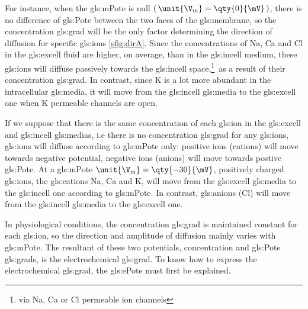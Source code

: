 \documentclass[class={myRUCProject}, crop=false]{standalone}
\begin{document}
For instance, when the \gls{gls:mPote} is null \(\br{\unit{\V\membrane}=\qty{0}{\mV}}\), there is no difference of \gls{gls:Pote} between the two faces of the \gls{gls:membrane}, so the concentration \gls{gls:grad} will be the only factor determining the direction of diffusion for specific \glspl{gls:ion} \cref{sfig:dirA}. 
Since the concentrations of \gls{Na}, \gls{Ca} and \gls{Cl} in the \gls{gls:excell} fluid are higher, on average, than in the \gls{gls:incell} medium, these \glspl{gls:ion} will diffuse passively towards the \gls{gls:incell} space,\footnote{via \gls{Na}, \gls{Ca} or \gls{Cl} permeable ion channels}~as a result of their concentration \gls{gls:grad}. 
In contrast, since \gls{K} is a lot more abundant in the intracellular \gls{gls:media}, it will move from the \gls{gls:incell} \gls{gls:media} to the \gls{gls:excell} one when \gls{K} permeable channels are open. 

If we suppose that there is the same concentration of each \gls{gls:ion} in the \gls{gls:excell} and \gls{gls:incell} \glspl{gls:media}, i.e there is no concentration \gls{gls:grad} for any \glspl{gls:ion}, \glspl{gls:ion} will diffuse according to \gls{gls:mPote} only: positive ions (cations) will move towards negative potential, negative ions (anions) will move towards postive \gls{gls:Pote}. At a \gls{gls:mPote} \(\unit{\V\membrane}=\qty{-30}{\mV}\), positively charged \glspl{gls:ion}, the \glspl{gls:cation} \gls{Na}, \gls{Ca} and \gls{K}, will move from the \gls{gls:excell} \gls{gls:media} to the \gls{gls:incell} one according to \gls{gls:mPote}. In contrast, \glspl{gls:anion} (\gls{Cl}) will move from the \gls{gls:incell} \gls{gls:media} to the \gls{gls:excell} one. 

In physiological conditions, the concentration \gls{gls:grad} is maintained constant for each \gls{gls:ion}, so the direction and amplitude of diffusion mainly varies with \gls{gls:mPote}. 
The resultant of these two potentials, concentration and \gls{gls:Pote} \glspl{gls:grad}, is the electrochemical \gls{gls:grad}. To know how to express the electrochemical \gls{gls:grad}, the \gls{gls:ePote} must first be explained.
 
\end{document}
